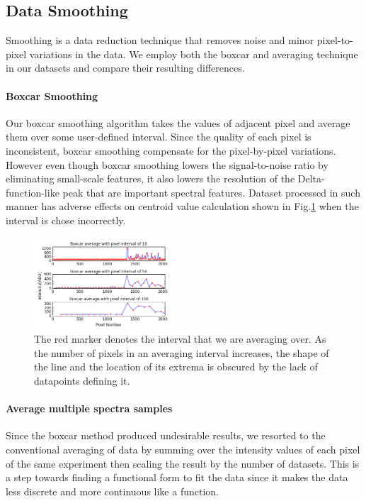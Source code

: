 \documentclass[authoryear, 12pt,5p, times]{elsarticle}
\begin{document}
  \subsection{Data Smoothing}
  Smoothing is a data reduction technique that removes noise and minor pixel-to-pixel variations in the data. We employ both the boxcar and averaging technique in our datasets and compare their resulting differences.
  \paragraph*{\textbf{Boxcar Smoothing}}
  Our boxcar smoothing algorithm takes the values of adjacent pixel and average them over some user-defined interval. Since the quality of each pixel is inconsistent, boxcar smoothing compensate for the pixel-by-pixel variations.  However even though boxcar smoothing lowers the signal-to-noise ratio by eliminating small-scale features, it also lowers the resolution of the Delta-function-like peak that are important spectral features. Dataset processed in such manner has adverse effects on centroid value calculation shown in Fig.\ref{boxcar} when the interval is chose incorrectly.
 \begin{figure}[h!] 
\includegraphics[width=0.45\textwidth]{figures/boxcar}
\caption{The red marker denotes the interval that we are averaging over. As the number of pixels in an averaging interval increases, the shape of the line and the location of its extrema is obscured by the lack of datapoints defining it.}\label{boxcar}
\end{figure}
 \paragraph*{\textbf{Average multiple spectra samples}}
Since the boxcar method produced undesirable results, we resorted to the conventional averaging of data by summing over the intensity values of each pixel of the same experiment then scaling the result by the number of datasets. This is a step towards finding a functional form to fit the data since it makes the data less discrete and more continuous like a function. 
\end{document}
